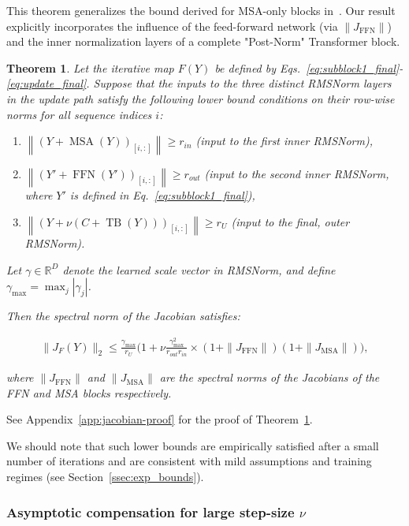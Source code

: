 \documentclass{zapiski}
\theoremstyle{plain}
\newtheorem{theorem}{Theorem}[section]
\theoremstyle{definition}
\theoremstyle{remark}
\newcommand{\norm}[1]{\left\lVert #1 \right\rVert}
\DeclareMathOperator{\FFN}{FFN}
\DeclareMathOperator{\MSA}{MSA}
\begin{document}
This theorem generalizes the bound derived for MSA-only blocks in~\cite{tomihari2025recurrentselfattentiondynamicsenergyagnostic}. Our result explicitly incorporates the influence of the feed-forward network (via $\|J_{\FFN}\|$) and the inner normalization layers of a complete "Post-Norm" Transformer block.

\begin{theorem}\label{thm:jacobian_bound_final}
Let the iterative map $F(Y)$ be defined by Eqs.~\eqref{eq:subblock1_final}-\eqref{eq:update_final}. Suppose that the inputs to the three distinct RMSNorm layers in the update path satisfy the following lower bound conditions on their row-wise norms for all sequence indices $i$:
\begin{enumerate}[label=(\roman*)]
    \item $\norm{(Y + \operatorname{MSA}(Y))_{[i,:]}} \ge r_{in}$ (input to the first inner RMSNorm),
    \item $\norm{(Y' + \operatorname{FFN}(Y'))_{[i,:]}} \ge r_{out}$ (input to the second inner RMSNorm, where $Y'$ is defined in Eq.~\eqref{eq:subblock1_final}),
    \item $\norm{(Y + \nu(C+\operatorname{TB}(Y)))_{[i,:]}} \ge r_U$ (input to the final, outer RMSNorm).
\end{enumerate}
Let \(\gamma \in \mathbb{R}^D\) denote the learned scale vector in RMSNorm, and define 
\(\gamma_{\max} = \max_j |\gamma_j|\).  

Then the spectral norm of the Jacobian satisfies:

\begin{align}
    \|J_F(Y)\|_2 \le 
    \frac{\gamma_{\max}}{r_U}
    \Bigg( 
        1 + 
        \nu \frac{\gamma_{\max}^2}{r_{out} r_{in}}
        \times \left(1 + \|J_{\FFN}\|\right) \left(1 + \|J_{\MSA}\|\right)
    \Bigg),
\end{align}

where $\|J_{\FFN}\|$ and $\|J_{\MSA}\|$ are the spectral norms of the Jacobians of the FFN and MSA blocks respectively.
\end{theorem}

See Appendix~\ref{app:jacobian-proof} for the proof of Theorem~\ref{thm:jacobian_bound_final}.

We should note that such lower bounds are empirically satisfied after a small number of iterations and are consistent with mild assumptions and training regimes (see Section~\ref{ssec:exp_bounds}).


\subsubsection{Asymptotic compensation for large step-size $\nu$}
\label{sssec:asymptotics}
\end{document}
